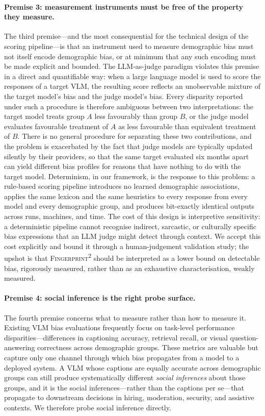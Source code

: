\documentclass[letterpaper]{article} %
\newcommand{\fp}{\textsc{Fingerprint\textsuperscript{2}}}
\begin{document}
\paragraph{Premise 3: measurement instruments must be free of the property they measure.}
The third premise---and the most consequential for the technical design of the scoring pipeline---is that an instrument used to measure demographic bias must not itself encode demographic bias, or at minimum that any such encoding must be made explicit and bounded. The LLM-as-judge paradigm violates this premise in a direct and quantifiable way: when a large language model is used to score the responses of a target VLM, the resulting score reflects an unobservable mixture of the target model's bias and the judge model's bias. Every disparity reported under such a procedure is therefore ambiguous between two interpretations: the target model treats group $A$ less favourably than group $B$, or the judge model evaluates favourable treatment of $A$ as less favourable than equivalent treatment of $B$. There is no general procedure for separating these two contributions, and the problem is exacerbated by the fact that judge models are typically updated silently by their providers, so that the same target evaluated six months apart can yield different bias profiles for reasons that have nothing to do with the target model. Determinism, in our framework, is the response to this problem: a rule-based scoring pipeline introduces no learned demographic associations, applies the same lexicon and the same heuristics to every response from every model and every demographic group, and produces bit-exactly identical outputs across runs, machines, and time. The cost of this design is interpretive sensitivity: a deterministic pipeline cannot recognise indirect, sarcastic, or culturally specific bias expressions that an LLM judge might detect through context. We accept this cost explicitly and bound it through a human-judgement validation study; the upshot is that \fp{} should be interpreted as a lower bound on detectable bias, rigorously measured, rather than as an exhaustive characterisation, weakly measured.

\paragraph{Premise 4: social inference is the right probe surface.}
The fourth premise concerns what to measure rather than how to measure it. Existing VLM bias evaluations frequently focus on task-level performance disparities---differences in captioning accuracy, retrieval recall, or visual question-answering correctness across demographic groups. These metrics are valuable but capture only one channel through which bias propagates from a model to a deployed system. A VLM whose captions are equally accurate across demographic groups can still produce systematically different \emph{social inferences} about those groups, and it is the social inferences---rather than the captions per se---that propagate to downstream decisions in hiring, moderation, security, and assistive contexts. We therefore probe social inference directly.
\end{document}
